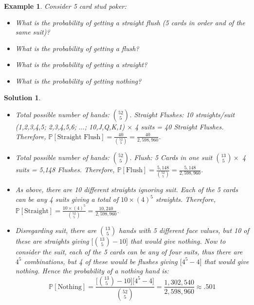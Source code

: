 \documentclass[12pt, letterpaper, onecolumn, conference, final]{IEEEtran}
\theoremstyle{definition}
\theoremstyle{plain}
\newtheorem{example}{Example}[section]
\newtheorem{solution}{Solution}[section]
\begin{document}
\begin{example}
Consider 5 card stud poker:
\begin{itemize}

\vspace{.2cm}
\item[(a)]
What is the probability of getting a straight flush (5 cards in order and of the same suit)?

\vspace{.2cm}
\item[(b)]
What is the probability of getting a flush?

\vspace{.2cm}
\item[(c)]
What is the probability of getting a straight?

\vspace{.2cm}
\item[(d)]
What is the probability of getting nothing?

\end{itemize}
\end{example}
\begin{solution}
\hfill
\begin{itemize}

\item[(a)]
Total possible number of hands: ${52 \choose 5}$. Straight Flushes: 10 straights/suit (1,2,3,4,5; 2,3,4,5,6; $\dots$; 10,J,Q,K,1) $\times$ 4 suits = 40 Straight Flushes. Therefore, $\mathbb{P}[\text{Straight Flush}] = \frac{40}{{52 \choose 5}} = \frac{40}{2,598,960}$.

\vspace{.2cm}
\item[(b)]
Total possible number of hands: ${52 \choose 5}$. Flush: 5 Cards in one suit ${13 \choose 5} \times$ 4 suits = 5,148 Flushes. Therefore, $\mathbb{P}[\text{Flush}] = \frac{5,148}{{52 \choose 5}} = \frac{5,148}{2,598,960}$.

\vspace{.2cm}
\item[(c)]
As above, there are 10 different straights ignoring suit. Each of the 5 cards can be any 4 suits giving a total of $10 \times (4)^5$ straights. Therefore, $\mathbb{P}[\text{Straight}] = \frac{10\times (4)^5}{{52 \choose 5}} = \frac{10,240}{2,598,960}$.

\vspace{.2cm}
\item[(d)]
Disregarding suit, there are ${13 \choose 5}$ hands with 5 different face values, but 10 of these are straights giving $\Big[ {13 \choose 5} - 10 \Big]$ that would give nothing. Now to consider the suit, each of the 5 cards can be any of four suits, thus there are $4^5$ combinations, but 4 of these would be flushes giving $\Big[ 4^5 - 4 \Big]$ that would give nothing. Hence the probability of a nothing hand is:
\begin{equation*}
\mathbb{P}[\text{Nothing}] = \frac{\Big[ {13 \choose 5} - 10 \Big] \Big[ 4^5 - 4 \Big]}{{52 \choose 5}} = \frac{1,302,540}{2,598,960} \approx .501
\end{equation*}

\end{itemize}
\end{solution}
\end{document}
